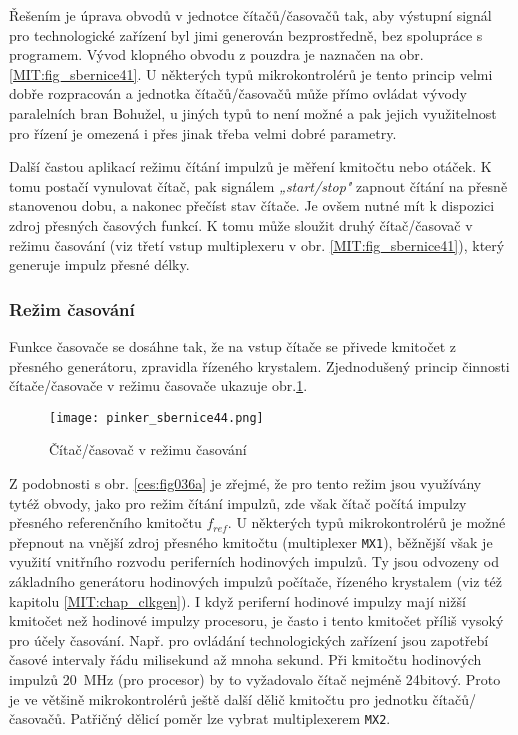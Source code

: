        Řešením je úprava obvodů v jednotce čítačů/časovačů tak, aby výstupní signál pro 
        technologické zařízení byl jimi generován bezprostředně, bez spolupráce s programem. Vývod 
        klopného obvodu z pouzdra je naznačen na obr. \ref{MIT:fig_sbernice41}. U některých typů 
        mikrokontrolérů je tento princip velmi dobře rozpracován a jednotka čítačů/časovačů může 
        přímo ovládat vývody paralelních bran Bohužel, u jiných typů to není možné a pak jejich 
        využitelnost pro řízení je omezená i přes jinak třeba velmi dobré parametry.
        
        Další častou aplikací režimu čítání impulzů je měření kmitočtu nebo otáček. K tomu postačí 
        vynulovat čítač, pak signálem \emph{„start/stop"} zapnout čítání na přesně stanovenou dobu, 
        a nakonec přečíst stav čítače. Je ovšem nutné mít k dispozici zdroj přesných časových 
        funkcí. K tomu může sloužit druhý čítač/časovač v režimu časování (viz třetí vstup 
        multiplexeru v obr. \ref{MIT:fig_sbernice41}), který generuje impulz přesné délky.
        
      \subsubsection{Režim časování}
        Funkce časovače se dosáhne tak, že na vstup čítače se přivede kmitočet z přesného 
        generátoru, zpravidla řízeného krystalem. Zjednodušený princip činnosti čítače/časovače v 
        režimu časovače ukazuje obr.\ref{MIT:fig_sbernice44}.
        
        \begin{figure}[ht!] %
          \centering
          \texttt{[image: pinker\_sbernice44.png]}
          \caption{Čítač/časovač v režimu časování}
          \label{MIT:fig_sbernice44}
        \end{figure}
        
        Z podobnosti s obr. \ref{ces:fig036a} je zřejmé, že pro tento režim jsou využívány 
        tytéž obvody, jako pro režim čítání impulzů, zde však čítač počítá impulzy přesného 
        referenčního kmitočtu \(f_{ref}\). U některých typů mikrokontrolérů je možné přepnout na 
        vnější zdroj přesného kmitočtu (multiplexer \texttt{MX1}), běžnější však je využití 
        vnitřního rozvodu periferních hodinových impulzů. Ty jsou odvozeny od základního generátoru 
        hodinových impulzů počítače, řízeného krystalem (viz též kapitolu \ref{MIT:chap_clkgen}). I 
        když periferní hodinové impulzy mají nižší kmitočet než hodinové impulzy procesoru, je 
        často i tento kmitočet příliš vysoký pro účely časování. Např. pro ovládání technologických 
        zařízení jsou zapotřebí časové intervaly řádu milisekund až mnoha sekund. Při kmitočtu 
        hodinových impulzů \qty{20}{\mega\hertz} (pro procesor) by to vyžadovalo čítač nejméně 
        24bitový. Proto je ve většině mikrokontrolérů ještě další dělič kmitočtu pro jednotku 
        čítačů/časovačů. Patřičný dělicí poměr lze vybrat multiplexerem \texttt{MX2}.
        
